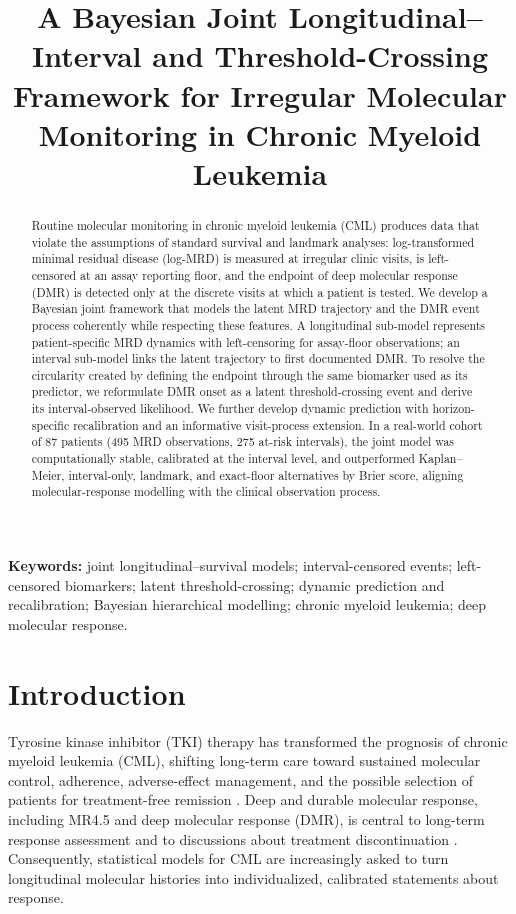 \documentclass[11pt]{article}
\title{A Bayesian Joint Longitudinal--Interval and Threshold-Crossing
Framework for Irregular Molecular Monitoring in Chronic Myeloid Leukemia}
\author{}     %
\date{}
\begin{document}
\maketitle

\begin{abstract}
Routine molecular monitoring in chronic myeloid leukemia (CML) produces
data that violate the assumptions of standard survival and landmark
analyses: log-transformed minimal residual disease (log-MRD) is measured
at irregular clinic visits, is left-censored at an assay reporting floor,
and the endpoint of deep molecular response (DMR) is detected only at the
discrete visits at which a patient is tested. We develop a Bayesian joint
framework that models the latent MRD trajectory and the DMR event process
coherently while respecting these features. A longitudinal sub-model
represents patient-specific MRD dynamics with left-censoring for
assay-floor observations; an interval sub-model links the latent
trajectory to first documented DMR. To resolve the circularity created by
defining the endpoint through the same biomarker used as its predictor, we
reformulate DMR onset as a latent threshold-crossing event and derive its
interval-observed likelihood. We further develop dynamic prediction with
horizon-specific recalibration and an informative visit-process extension.
In a real-world cohort of 87 patients (495 MRD observations, 275 at-risk
intervals), the joint model was computationally stable, calibrated at the
interval level, and outperformed Kaplan--Meier, interval-only, landmark,
and exact-floor alternatives by Brier score, aligning molecular-response
modelling with the clinical observation process.
\end{abstract}

\noindent\textbf{Keywords:} joint longitudinal--survival models;
interval-censored events; left-censored biomarkers; latent
threshold-crossing; dynamic prediction and recalibration; Bayesian
hierarchical modelling; chronic myeloid leukemia; deep molecular response.

\section{Introduction}

Tyrosine kinase inhibitor (TKI) therapy has transformed the prognosis of
chronic myeloid leukemia (CML), shifting long-term care toward sustained
molecular control, adherence, adverse-effect management, and the possible
selection of patients for treatment-free remission
\cite{Hochhaus2020ELN,Jabbour2025JAMAReview,Haddad2026Algorithms,Senapati2023CMLManagement}.
Deep and durable molecular response, including MR4.5 and deep molecular
response (DMR), is central to long-term response assessment and to
discussions about treatment discontinuation
\cite{Hughes2014EarlyMolecularResponse,Rasekh2026TFRPredictor,Ono2026MR45,Takahashi2026JSKI}.
Consequently, statistical models for CML are increasingly asked to turn
longitudinal molecular histories into individualized, calibrated
statements about response.
\end{document}
